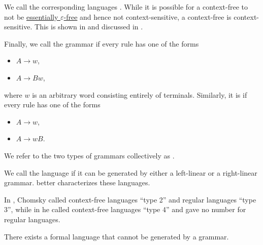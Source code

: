 \begin{definition}
\begin{thmenum}
    We call the corresponding languages . While it is possible for a context-free  to not be \hyperref[def:epsilon_free_grammar]{essentially \( \varepsilon \)-free} and hence not context-sensitive, a context-free  is context-sensitive. This is shown in  and discussed in .

     Finally, we call the grammar  if every rule has one of the forms
    \begin{itemize}
      \item \( A \to w \),
      \item \( A \to B w \),
    \end{itemize}
    where \( w \) is an arbitrary word consisting entirely of terminals. Similarly, it is  if every rule has one of the forms
    \begin{itemize}
      \item \( A \to w \),
      \item \( A \to w B \).
    \end{itemize}

    We refer to the two types of grammars collectively as .

    We call the language  if it can be generated by either a left-linear or a right-linear grammar.  better characterizes these languages.
  \end{thmenum}
\end{definition}
\begin{comments}
  \item In \cite[142]{Chomsky1959}, Chomsky called context-free languages \enquote{type 2} and regular languages \enquote{type 3}, while in \cite[366]{MathPsychology1963Vol2} he called context-free languages \enquote{type 4} and gave no number for regular languages.
\end{comments}

\begin{proposition}\label{thm:non_recursively_enumerable_language}
  There exists a formal language that cannot be generated by a grammar.
\end{proposition}

